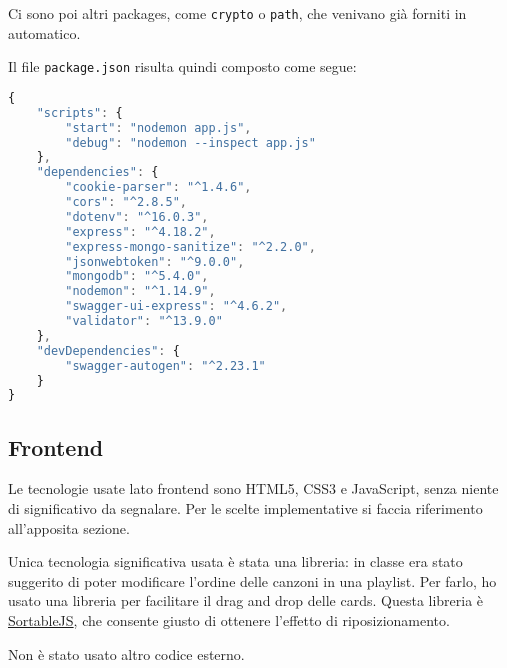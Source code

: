 Ci sono poi altri packages, come \verb|crypto| o \verb|path|, che venivano già forniti in automatico.

Il file \verb|package.json| risulta quindi composto come segue:
\begin{lstlisting}[language=JavaScript]
{
    "scripts": {
        "start": "nodemon app.js",
        "debug": "nodemon --inspect app.js"
    },
    "dependencies": {
        "cookie-parser": "^1.4.6",
        "cors": "^2.8.5",
        "dotenv": "^16.0.3",
        "express": "^4.18.2",
        "express-mongo-sanitize": "^2.2.0",
        "jsonwebtoken": "^9.0.0",
        "mongodb": "^5.4.0",
        "nodemon": "^1.14.9",
        "swagger-ui-express": "^4.6.2",
        "validator": "^13.9.0"
    },
    "devDependencies": {
        "swagger-autogen": "^2.23.1"
    }
}
\end{lstlisting}
\subsection{Frontend}
Le tecnologie usate lato frontend sono HTML5, CSS3 e JavaScript, senza niente di significativo da segnalare. Per le scelte implementative si faccia riferimento all'apposita sezione.

Unica tecnologia significativa usata è stata una libreria: in classe era stato suggerito di poter modificare l'ordine delle canzoni in una playlist. Per farlo, ho usato una libreria per facilitare il drag and drop delle cards. Questa libreria è \href{https://sortablejs.github.io/Sortable/}{SortableJS}, che consente giusto di ottenere l'effetto di riposizionamento.

Non è stato usato altro codice esterno.
\newpage